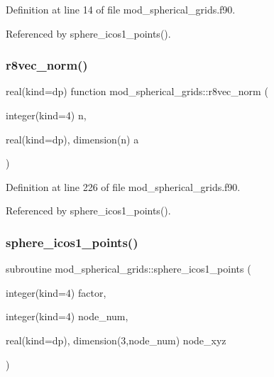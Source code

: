 Definition at line 14 of file mod\+\_\+spherical\+\_\+grids.\+f90.



Referenced by sphere\+\_\+icos1\+\_\+points().

\mbox{\label{namespacemod__spherical__grids_adbe3eff686f6254a50a5afd75255c2c8}} 
\subsubsection{\texorpdfstring{r8vec\+\_\+norm()}{r8vec\_norm()}}
{\footnotesize\ttfamily real(kind=dp) function mod\+\_\+spherical\+\_\+grids\+::r8vec\+\_\+norm (\begin{DoxyParamCaption}\item[{integer(kind=4)}]{n,  }\item[{real(kind=dp), dimension(n)}]{a }\end{DoxyParamCaption})}



Definition at line 226 of file mod\+\_\+spherical\+\_\+grids.\+f90.



Referenced by sphere\+\_\+icos1\+\_\+points().

\mbox{\label{namespacemod__spherical__grids_a58af853045eb54cbf3a8515e0f48b23b}} 
\subsubsection{\texorpdfstring{sphere\+\_\+icos1\+\_\+points()}{sphere\_icos1\_points()}}
{\footnotesize\ttfamily subroutine mod\+\_\+spherical\+\_\+grids\+::sphere\+\_\+icos1\+\_\+points (\begin{DoxyParamCaption}\item[{integer(kind=4)}]{factor,  }\item[{integer(kind=4)}]{node\+\_\+num,  }\item[{real(kind=dp), dimension(3,node\+\_\+num)}]{node\+\_\+xyz }\end{DoxyParamCaption})}



